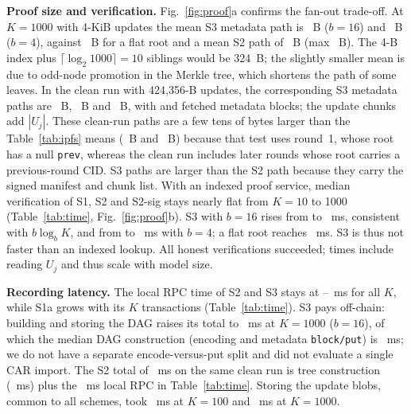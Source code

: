 \documentclass[final,3p,times,twocolumn]{elsarticle}
\begin{document}
\textbf{Proof size and verification.} Fig.~\ref{fig:proof}a confirms the fan-out trade-off. At $K=1000$ with 4-KiB updates the mean S3 metadata path is ~B ($b=16$) and ~B ($b=4$), against ~B for a flat root and a mean S2 path of ~B (max ~B). The 4-B index plus $\lceil\log_2 1000\rceil=10$ siblings would be 324~B; the slightly smaller mean is due to odd-node promotion in the Merkle tree, which shortens the path of some leaves. In the clean run with 424,356-B updates, the corresponding S3 metadata paths are ~B, ~B and ~B, with  and  fetched metadata blocks; the update chunks add $|U_j|$. These clean-run paths are a few tens of bytes larger than the Table~\ref{tab:ipfs} means (~B and ~B) because that test uses round~1, whose root has a null \texttt{prev}, whereas the clean run includes later rounds whose root carries a previous-round CID. S3 paths are larger than the S2 path because they carry the signed manifest and chunk list. With an indexed proof service, median verification of S1, S2 and S2-sig stays nearly flat from $K=10$ to 1000 (Table~\ref{tab:time}, Fig.~\ref{fig:proof}b). S3 with $b=16$ rises from  to ~ms, consistent with $b\log_b K$, and from  to ~ms with $b=4$; a flat root reaches ~ms. S3 is thus not faster than an indexed lookup. All honest verifications succeeded; times include reading $U_j$ and thus scale with model size.

\textbf{Recording latency.} The local RPC time of S2 and S3 stays at --~ms for all $K$, while S1a grows with its $K$ transactions (Table~\ref{tab:time}). S3 pays off-chain: building and storing the DAG raises its total to ~ms at $K=1000$ ($b=16$), of which the median DAG construction (encoding and metadata \texttt{block/put}) is ~ms; we do not have a separate encode-versus-put split and did not evaluate a single CAR import. The S2 total of ~ms on the same clean run is tree construction (~ms) plus the ~ms local RPC in Table~\ref{tab:time}. Storing the update blobs, common to all schemes, took ~ms at $K=100$ and ~ms at $K=1000$.
\end{document}
